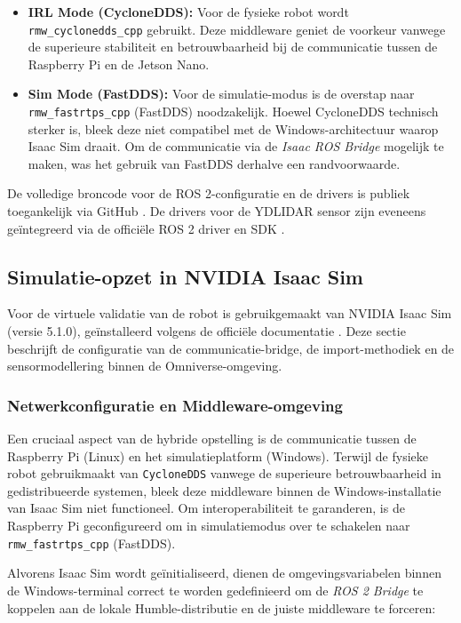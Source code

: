 \begin{itemize}
\item \textbf{IRL Mode (CycloneDDS):} Voor de fysieke robot wordt \texttt{rmw\_cyclonedds\_cpp} gebruikt. Deze middleware geniet de voorkeur vanwege de superieure stabiliteit en betrouwbaarheid bij de communicatie tussen de Raspberry Pi en de Jetson Nano.
\item \textbf{Sim Mode (FastDDS):} Voor de simulatie-modus is de overstap naar \texttt{rmw\_fastrtps\_cpp} (FastDDS) noodzakelijk. Hoewel CycloneDDS technisch sterker is, bleek deze niet compatibel met de Windows-architectuur waarop Isaac Sim draait. Om de communicatie via de \textit{Isaac ROS Bridge} mogelijk te maken, was het gebruik van FastDDS derhalve een randvoorwaarde.
\end{itemize}

De volledige broncode voor de ROS 2-configuratie en de drivers is publiek toegankelijk via GitHub \autocite{Wyffels2026}. De drivers voor de YDLIDAR sensor zijn eveneens geïntegreerd via de officiële ROS 2 driver en SDK \autocite{YDLIDAR2026, YDLIDAR2026a}.



\subsection{Simulatie-opzet in NVIDIA Isaac Sim}
\label{sec:isaac_sim_setup}

Voor de virtuele validatie van de robot is gebruikgemaakt van NVIDIA Isaac Sim (versie 5.1.0), geïnstalleerd volgens de officiële documentatie \autocite{NVIDIA2026}. Deze sectie beschrijft de configuratie van de communicatie-bridge, de import-methodiek en de sensormodellering binnen de Omniverse-omgeving.

\subsubsection{Netwerkconfiguratie en Middleware-omgeving}
Een cruciaal aspect van de hybride opstelling is de communicatie tussen de Raspberry Pi (Linux) en het simulatieplatform (Windows). Terwijl de fysieke robot gebruikmaakt van \texttt{CycloneDDS} vanwege de superieure betrouwbaarheid in gedistribueerde systemen, bleek deze middleware binnen de Windows-installatie van Isaac Sim niet functioneel. Om interoperabiliteit te garanderen, is de Raspberry Pi geconfigureerd om in simulatiemodus over te schakelen naar \texttt{rmw\_fastrtps\_cpp} (FastDDS).

Alvorens Isaac Sim wordt geïnitialiseerd, dienen de omgevingsvariabelen binnen de Windows-terminal correct te worden gedefinieerd om de \textit{ROS 2 Bridge} te koppelen aan de lokale Humble-distributie en de juiste middleware te forceren:

